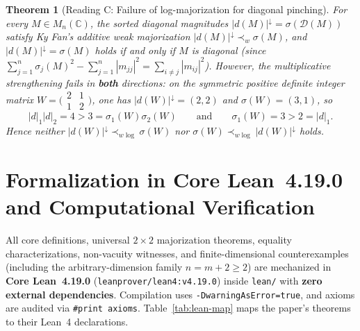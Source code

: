 \documentclass[11pt,a4paper]{article}
\newtheorem{theorem}{Theorem}[section]
\theoremstyle{definition}
\newcommand{\C}{\mathbb{C}}
\begin{document}
\begin{theorem}[Reading C: Failure of log-majorization for diagonal pinching]\label{thm:pinching}
For every $M \in M_n(\C)$, the sorted diagonal magnitudes $|d(M)|^\downarrow = \sigma(\mathcal{D}(M))$ satisfy Ky Fan's additive weak majorization $|d(M)|^\downarrow \prec_w \sigma(M)$, and $|d(M)|^\downarrow = \sigma(M)$ holds if and only if $M$ is diagonal (since $\sum_{j=1}^n \sigma_j(M)^2 - \sum_{j=1}^n |m_{jj}|^2 = \sum_{i \ne j} |m_{ij}|^2$). However, the multiplicative strengthening fails in \textbf{both} directions: on the symmetric positive definite integer matrix $W = \bigl(\begin{smallmatrix} 2 & 1 \\ 1 & 2 \end{smallmatrix}\bigr)$, one has $|d(W)|^\downarrow = (2, 2)$ and $\sigma(W) = (3, 1)$, so
\[
  |d|_1 |d|_2 = 4 > 3 = \sigma_1(W)\sigma_2(W)
  \qquad\text{and}\qquad
  \sigma_1(W) = 3 > 2 = |d|_1.
\]
Hence neither $|d(W)|^\downarrow \prec_{w\log} \sigma(W)$ nor $\sigma(W) \prec_{w\log} |d(W)|^\downarrow$ holds.
\end{theorem}

\section{Formalization in Core Lean~4.19.0 and Computational Verification}

All core definitions, universal $2\times 2$ majorization theorems, equality characterizations, non-vacuity witnesses, and finite-dimensional counterexamples (including the arbitrary-dimension family $n = m + 2 \ge 2$) are mechanized in \textbf{Core Lean~4.19.0} (\texttt{leanprover/lean4:v4.19.0}) inside \texttt{lean/} with \textbf{zero external dependencies}. Compilation uses \texttt{-DwarningAsError=true}, and axioms are audited via \texttt{\#print axioms}. Table~\ref{tab:lean-map} maps the paper's theorems to their Lean~4 declarations.
\end{document}
